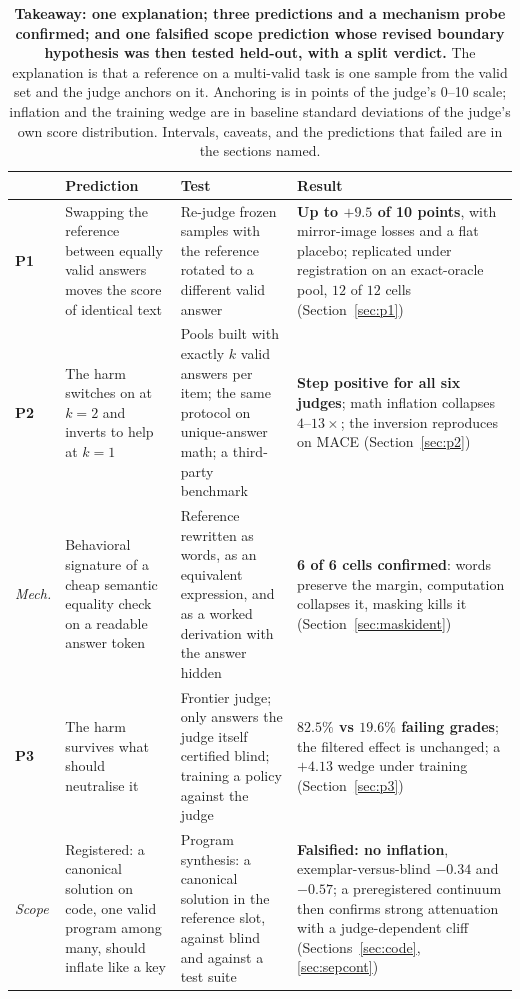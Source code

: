 \documentclass[11pt]{article}
\begin{document}
\begin{table}[t!]
\centering
\small
\setlength{\tabcolsep}{5pt}
\begin{tabular}{L{1.1cm}L{4.6cm}L{4.2cm}L{4.0cm}}
\toprule
& Prediction & Test & Result \\
\midrule
\textbf{P1} & Swapping the reference between equally valid answers moves the score of identical text &
Re-judge frozen samples with the reference rotated to a different valid answer &
\textbf{Up to $+9.5$ of 10 points}, with mirror-image losses and a flat placebo; replicated under registration on an exact-oracle pool, $12$ of $12$ cells (Section~\ref{sec:p1}) \\
\addlinespace[3pt]
\textbf{P2} & The harm switches on at $k{=}2$ and inverts to help at $k{=}1$ &
Pools built with exactly $k$ valid answers per item; the same protocol on unique-answer math; a third-party benchmark &
\textbf{Step positive for all six judges}; math inflation collapses $4$--$13\times$; the inversion reproduces on \textsc{MACE} (Section~\ref{sec:p2}) \\
\addlinespace[3pt]
\emph{Mech.} & Behavioral signature of a cheap semantic equality check on a readable answer token &
Reference rewritten as words, as an equivalent expression, and as a worked derivation with the answer hidden &
\textbf{6 of 6 cells confirmed}: words preserve the margin, computation collapses it, masking kills it (Section~\ref{sec:maskident}) \\
\addlinespace[3pt]
\textbf{P3} & The harm survives what should neutralise it &
Frontier judge; only answers the judge itself certified blind; training a policy against the judge &
\textbf{$82.5\%$ vs $19.6\%$ failing grades}; the filtered effect is unchanged; a $+4.13$ wedge under training (Section~\ref{sec:p3}) \\
\midrule
\emph{Scope} & Registered: a canonical solution on code, one valid program among many, should inflate like a key &
Program synthesis: a canonical solution in the reference slot, against blind and against a test suite &
\textbf{Falsified: no inflation}, exemplar-versus-blind $-0.34$ and $-0.57$; a preregistered continuum then confirms strong attenuation with a judge-dependent cliff (Sections~\ref{sec:code}, \ref{sec:sepcont}) \\
\bottomrule
\end{tabular}
\caption{\textbf{Takeaway: one explanation; three predictions and a mechanism probe confirmed; and one falsified scope prediction whose revised boundary hypothesis was then tested held-out, with a split verdict.} The explanation is that a reference on a multi-valid task is one sample from the valid set and the judge anchors on it. Anchoring is in points of the judge's 0--10 scale; inflation and the training wedge are in baseline standard deviations of the judge's own score distribution. Intervals, caveats, and the predictions that failed are in the sections named.}
\label{tab:predictions}
\end{table}
\end{document}
